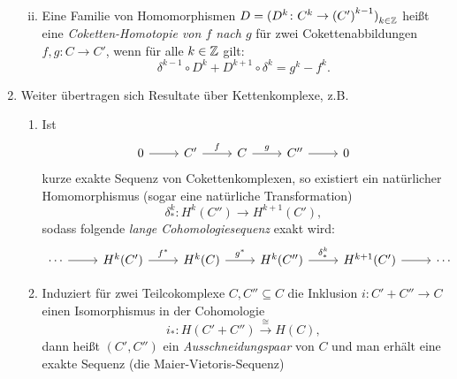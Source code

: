 \begin{kommentar}
\begin{enumerate}
\begin{enumerate}[(i)]
\begin{align*}
          \end{align*}
        \item
          Eine Familie von Homomorphismen $D = {(D^k \colon C^k \to {(C')}^{k-1})}_{k \in \mathbb{Z}}$ heißt eine \emph{Coketten-Homotopie von $f$ nach $g$} für zwei Cokettenabbildungen $f,g \colon C \to C'$, wenn für alle $k \in \mathbb{Z}$ gilt:
          \begin{equation*}
            \delta^{k-1} \circ D^k + D^{k+1} \circ \delta^k = g^k - f^k.
          \end{equation*}
      \end{enumerate}
    \item
      Weiter übertragen sich Resultate über Kettenkomplexe, z.B.\
      \begin{enumerate}
        \item 
          Ist
          \begin{equation*}
            \begin{tikzcd}
              0 \arrow{r}{} & C' \arrow{r}{f} & C \arrow{r}{g}  & C'' \arrow{r}{} & 0
            \end{tikzcd}
          \end{equation*}
          kurze exakte Sequenz von Cokettenkomplexen, so existiert ein natürlicher Homomorphismus (sogar eine natürliche Transformation)
          \begin{equation*}
            \delta^k_*\colon H^k(C'') \to H^{k+1}(C'),
          \end{equation*}
          sodass folgende \emph{lange Cohomologiesequenz} exakt wird:
          \begin{equation*}
            \begin{tikzcd}
              \dotsb \arrow{r}{}  & H^k(C') \arrow{r}{f^*}  & H^k(C) \arrow{r}{g^*} & H^k(C'') \arrow{r}{\delta^k_*}  & H^{k+1}(C') \arrow{r}{} & \dotsb
            \end{tikzcd}
          \end{equation*}
        \item
          Induziert für zwei Teilcokomplexe $C,C'' \subseteq C$ die Inklusion $i\colon C' + C'' \to C$ einen Isomorphismus in der Cohomologie
          \begin{equation*}
            i_*\colon H(C' + C'') \overset{\cong}{\longrightarrow} H(C),
          \end{equation*}
          dann heißt $(C',C'')$ ein \emph{Ausschneidungspaar} von $C$ und man erhält eine exakte Sequenz (die Maier-Vietoris-Sequenz)

\end{enumerate}
\end{enumerate}
\end{kommentar}
